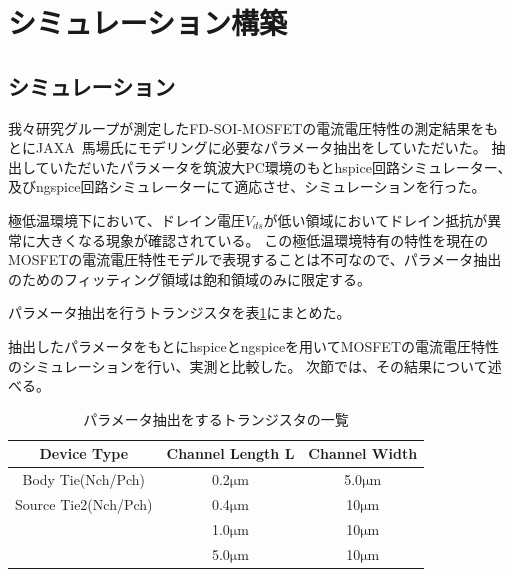 	\section{シミュレーション構築}
		\subsection{シミュレーション}
			我々研究グループが測定したFD-SOI-MOSFETの電流電圧特性の測定結果をもとにJAXA\ 馬場氏にモデリングに必要なパラメータ抽出をしていただいた。
			抽出していただいたパラメータを筑波大PC環境のもとhspice回路シミュレーター、及びngspice回路シミュレーターにて適応させ、シミュレーションを行った。
			
			極低温環境下において、ドレイン電圧$V_{ds}$が低い領域においてドレイン抵抗が異常に大きくなる現象が確認されている。
			この極低温環境特有の特性を現在のMOSFETの電流電圧特性モデルで表現することは不可なので、パラメータ抽出のためのフィッティング領域は飽和領域のみに限定する。
			
			パラメータ抽出を行うトランジスタを表\ref{tab:extract_transistor}にまとめた。
			
			抽出したパラメータをもとにhspiceとngspiceを用いてMOSFETの電流電圧特性のシミュレーションを行い、実測と比較した。
			次節では、その結果について述べる。
			\begin{table}[htb]
				\begin{center}
					\begin{tabular}{| c | c | c |} \hline
						Device Type & Channel Length L & Channel Width \\ \hline \hline
						Body Tie(Nch/Pch) & 0.2$\mathrm{\mu m}$ & 5.0$\mathrm{\mu m}$ \\ \hline
						Source Tie2(Nch/Pch) & 0.4$\mathrm{\mu m}$ & 10$\mathrm{\mu m}$ \\
						\ & 1.0$\mathrm{\mu m}$ & 10$\mathrm{\mu m}$ \\
						\ & 5.0$\mathrm{\mu m}$ & 10$\mathrm{\mu m}$ \\ \hline
					\end{tabular}
					\caption{パラメータ抽出をするトランジスタの一覧}
					\label{tab:extract_transistor}
				\end{center}
			\end{table}
			
